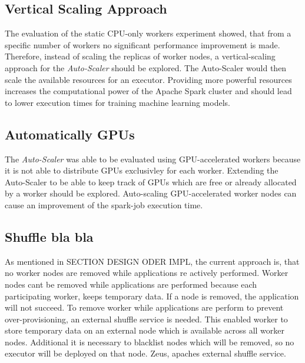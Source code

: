 \subsection{Vertical Scaling Approach}
The evaluation of the static CPU-only workers experiment showed, that from a specific number of workers no significant performance improvement is made.
Therefore, instead of scaling the replicas of worker nodes, a vertical-scaling approach for the \textit{Auto-Scaler} should be explored. The Auto-Scaler would then scale the available resources for an executor.
Providing more powerful resources increases the computational power of the Apache Spark cluster and should lead to lower execution times for training machine learning models.


\subsection{Automatically GPUs}
\label{subsec:08_outlook_gpus}
The \textit{Auto-Scaler} was able to be evaluated using GPU-accelerated workers because it is not able to distribute GPUs exclusivley for each worker.
Extending the Auto-Scaler to be able to keep track of GPUs which are free or already allocated by a worker should be explored.
%
Auto-scaling GPU-accelerated worker nodes can cause an improvement of the spark-job execution time.


\subsection{Shuffle bla bla}
As mentioned in SECTION DESIGN ODER IMPL, the current approach is, that no worker nodes are removed while applications re actively performed.
Worker nodes cant be removed while applications are performed because each participating worker, keeps temporary data. If a node is removed, the application will not succeed.
%
To remove worker while applications are perform to prevent over-provisioning, an external shuffle service is needed. This enabled worker to store temporary data on an external node which is available across all worker nodes.
Additional it is necessary to blacklist nodes which will be removed, so no executor will be deployed on that node.
%
Zeus, apaches external shuffle service.
